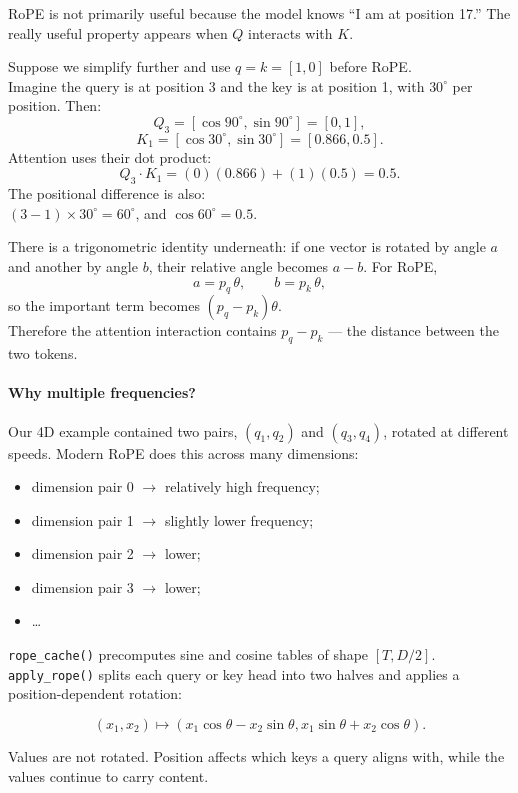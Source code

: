 RoPE is not primarily useful because the model knows ``I am at position 17.''
The really useful property appears when \(Q\) interacts with \(K\).

Suppose we simplify further and use \(q=k=[1,0]\) before RoPE. \\
Imagine the query is at position 3 and the key is at position 1, with
\(30^{\circ}\) per
position. Then:
\[
  Q_3=[\cos 90^{\circ},\sin 90^{\circ}]=[0,1],
\]
\[
  K_1=[\cos 30^{\circ},\sin 30^{\circ}]=[0.866,0.5].
\]
Attention uses their dot product:
\[
  Q_3\cdot K_1=(0)(0.866)+(1)(0.5)=0.5.
\]
The positional difference is also: \\
\((3-1)\times 30^{\circ}=60^{\circ}\), and
\(\cos 60^{\circ}=0.5\).

There is a trigonometric identity underneath: if one vector is rotated by
angle \(a\) and another by angle \(b\), their relative angle becomes
\(a-b\). For RoPE,
\[
  a=p_q\,\theta,\qquad b=p_k\,\theta,
\]
so the important term becomes \((p_q-p_k)\theta\). \\
Therefore the attention
interaction contains \(p_q-p_k\) --- the distance between the two tokens.

\paragraph{Why multiple frequencies?}
Our 4D example contained two pairs, \((q_1,q_2)\) and \((q_3,q_4)\), rotated
at different speeds. Modern RoPE does this across many dimensions:
\begin{itemize}
    \setlength{\itemsep}{0pt}
  \item dimension pair 0 $\rightarrow$ relatively high frequency;
  \item dimension pair 1 $\rightarrow$ slightly lower frequency;
  \item dimension pair 2 $\rightarrow$ lower;
  \item dimension pair 3 $\rightarrow$ lower;
  \item \ldots
\end{itemize}

\texttt{rope\_cache()} precomputes sine and cosine tables of shape
\([T,D/2]\). \\
\texttt{apply\_rope()} splits each query or key head into two
halves and applies a position-dependent rotation:

\[
  (x_1,x_2)\longmapsto
  (x_1\cos\theta-x_2\sin\theta,
  x_1\sin\theta+x_2\cos\theta).
\]

Values are not rotated. Position affects which keys a query aligns with, while
the values continue to carry content.

